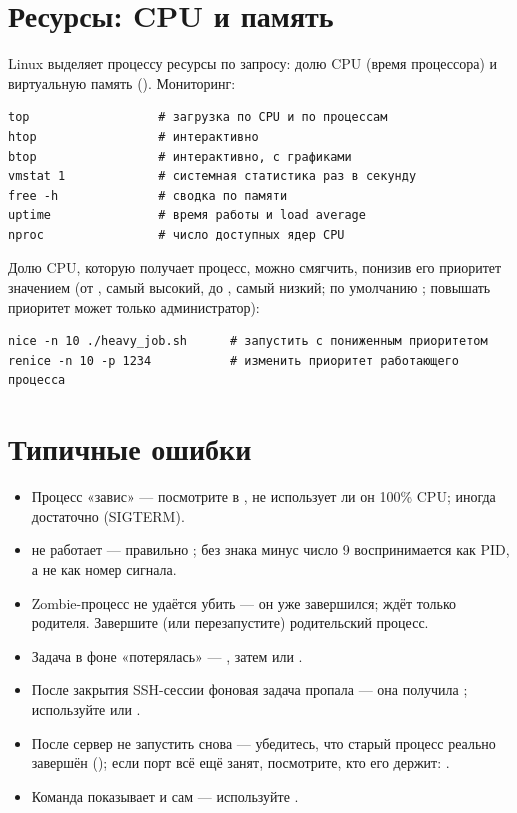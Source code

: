 \section{Ресурсы: CPU и память}

Linux выделяет процессу ресурсы по запросу: долю CPU
(время процессора) и виртуальную память
(). Мониторинг:
\begin{verbatim}
top                  # загрузка по CPU и по процессам
htop                 # интерактивно
btop                 # интерактивно, с графиками
vmstat 1             # системная статистика раз в секунду
free -h              # сводка по памяти
uptime               # время работы и load average
nproc                # число доступных ядер CPU
\end{verbatim}

Долю CPU, которую получает процесс, можно смягчить, понизив его
приоритет значением  (от , самый высокий,
до , самый низкий; по умолчанию ; повышать
приоритет может только администратор):
\begin{verbatim}
nice -n 10 ./heavy_job.sh      # запустить с пониженным приоритетом
renice -n 10 -p 1234           # изменить приоритет работающего процесса
\end{verbatim}

\section{Типичные ошибки}
\begin{itemize}
  \item Процесс «завис» --- посмотрите в , не
    использует ли он 100\% CPU; иногда достаточно
     (SIGTERM).
  \item {} не работает --- правильно
    ; без знака минус число 9 воспринимается как
    PID, а не как номер сигнала.
  \item Zombie-процесс не удаётся убить --- он уже завершился;
    ждёт только родителя. Завершите (или перезапустите)
    родительский процесс.
  \item Задача в фоне «потерялась» --- ,
    затем  или .
  \item После закрытия SSH-сессии фоновая задача пропала ---
    она получила ; используйте  или
    .
  \item После  сервер не запустить снова ---
    убедитесь, что старый процесс реально завершён
    (); если порт всё ещё занят,
    посмотрите, кто его держит: .
  \item Команда  показывает и сам 
    --- используйте .
\end{itemize}

